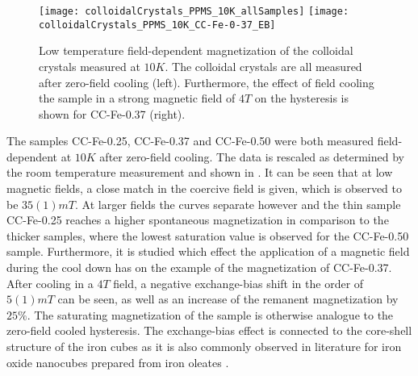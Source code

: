 \documentclass[\main/dresen_thesis.tex]{subfiles}
\begin{document}
    \begin{figure}[tb]
      \centering
      \texttt{[image: colloidalCrystals\_PPMS\_10K\_allSamples]}
      \texttt{[image: colloidalCrystals\_PPMS\_10K\_CC-Fe-0-37\_EB]}
      \caption{\label{fig:colloidalCrystals:10KVSM}Low temperature field-dependent magnetization of the colloidal crystals measured at $10 \unit{K}$. The colloidal crystals are all measured after zero-field cooling (left). Furthermore, the effect of field cooling the sample in a strong magnetic field of $4 \unit{T}$ on the hysteresis is shown for CC-Fe-0.37 (right).}
    \end{figure}
    The samples CC-Fe-0.25, CC-Fe-0.37 and CC-Fe-0.50 were both measured field-dependent at $10 \unit{K}$ after zero-field cooling. The data is rescaled as determined by the room temperature measurement and shown in .
    It can be seen that at low magnetic fields, a close match in the coercive field is given, which is observed to be $35(1) \unit{mT}$.
    At larger fields the curves separate however and the thin sample CC-Fe-0.25 reaches a higher spontaneous magnetization in comparison to the thicker samples, where the lowest saturation value is observed for the CC-Fe-0.50 sample.
    Furthermore, it is studied which effect the application of a magnetic field during the cool down has on the example of the magnetization of CC-Fe-0.37.
    After cooling in a $4 \unit{T}$ field, a negative exchange-bias shift in the order of $5(1) \unit{mT}$ can be seen, as well as an increase of the remanent magnetization by $25 \%$.
    The saturating magnetization of the sample is otherwise analogue to the zero-field cooled hysteresis.
    The exchange-bias effect is connected to the core-shell structure of the iron cubes as it is also commonly observed in literature for iron oxide nanocubes prepared from iron oleates \cite{Wetterskog_2013_Anoma}.
\end{document}
